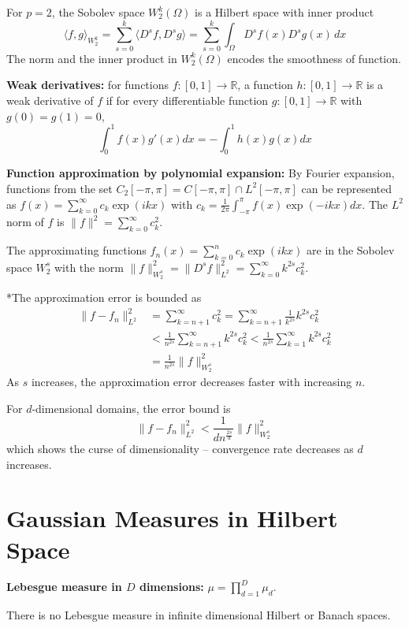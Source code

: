 \documentclass[12pt]{article}
\begin{document}
For $p = 2$, the Sobolev space $W^k_2(\Omega)$ is a Hilbert space with inner product
$$
\langle f, g \rangle_{W^k_2} = \sum_{s=0}^{k} \langle D^s f, D^s g \rangle = \sum_{s=0}^k \int_\Omega D^s f(x) D^s g(x) \, dx
$$
The norm and the inner product in $W^k_2(\Omega)$ encodes the smoothness of function.

\textbf{Weak derivatives:} for functions $f: [0,1] \to \mathbb{R}$, a function $h: [0,1] \to \mathbb{R}$ is a weak derivative of $f$ if for every differentiable function $g: [0,1] \to \mathbb{R}$ with $g(0) = g(1) = 0$,
$$
\int_0^1 f(x) g'(x) dx = -\int_0^1 h(x) g(x) dx
$$

\textbf{Function approximation by polynomial expansion:} By Fourier expansion, functions from the set $C_2[-\pi, \pi] = C[-\pi, \pi] \cap L^2[-\pi, \pi]$ can be represented as $f(x) = \sum_{k=0}^\infty c_k \exp(ikx)$ with $c_k = \frac{1}{2\pi} \int_{-\pi}^{\pi} f(x) \exp(-ikx) dx$. The $L^2$ norm of $f$ is $\|f\|^2 = \sum_{k=0}^\infty c_k^2$.

The approximating functions $f_n(x) = \sum^n_{k=0} c_k \exp(ikx)$ are in the Sobolev space $W^s_2$ with the norm
$\|f\|^2_{W^s_2} = \| D^s f \|^2_{L^2} = \sum_{k=0}^\infty k^{2s} c_k^2$.

*The approximation error is bounded as
\begin{align*}
\|f - f_n\|^2_{L^2} &= \sum_{k=n+1}^\infty c_k^2 = \sum_{k=n+1}^\infty \frac{1}{k^{2s}} k^{2s} c_k^2 \\
&< \frac{1}{n^{2s}} \sum_{k=n+1}^\infty k^{2s} c_k^2 <  \frac{1}{n^{2s}} \sum_{k=1}^\infty k^{2s} c_k^2 \\
&= \frac{1}{n^{2s}} \|f\|^2_{W^s_2}
\end{align*}
As $s$ increases, the approximation error decreases faster with increasing $n$.

For $d$-dimensional domains, the error bound is $$\|f - f_n\|^2_{L^2} < \frac{1}{dn^\frac{2s}{d}} \|f\|^2_{W^s_2}$$ which shows the curse of dimensionality -- convergence rate decreases as $d$ increases.

\section{Gaussian Measures in Hilbert Space}
\textbf{Lebesgue measure in $D$ dimensions:} $\mu = \prod_{d=1}^D \mu_d$.

There is no Lebesgue measure in infinite dimensional Hilbert or Banach spaces.
\end{document}
